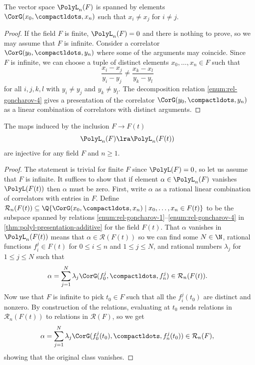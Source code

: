 \documentclass[a4paper]{amsart}
\begin{document}
\begin{proposition}\label{proposition: generic correlators}
    The vector space $\PolyL_n(F)$ is spanned by elements $\CorG(x_0,\compactldots,x_n)$ such that  $x_i\neq x_j$ for $i\neq j$.
\end{proposition}

\begin{proof} If the field $F$ is finite, $\PolyL_n(F)=0$ and there is nothing to prove, so we may assume that $F$ is infinite. Consider a correlator $\CorG(y_0,\compactldots,y_n)$ where some of the arguments may coincide. Since $F$ is infinite, we can choose a tuple of distinct elements $x_0,\dots,x_n \in F$ such that 
\[
\frac{x_i-x_j}{y_i-y_j} \neq \frac{x_k-x_l}{y_k-y_l}
\]
for all $i,j,k,l$ with $y_i\neq y_j$ and $y_k\neq y_l$. The decomposition relation \eqref{enum:rel-goncharov-4} gives a presentation of the correlator $\CorG(y_0,\compactldots,y_n)$ as a linear combination of correlators with distinct arguments.
\end{proof}

\begin{proposition} \label{prop: injectivity Goncharov complex transcendental extensions}
    The maps induced by the inclusion $F \to F(t)$
    \[\PolyL_n(F) \lra \PolyL_n(F(t))\]
    are injective for any field $F$ and $n \ge 1$. 
\end{proposition}

\begin{proof}
The statement is trivial for finite $F$ since $\PolyL(F)=0$, so let us assume that $F$ is infinite. It suffices to show that if element $\alpha \in \PolyL_n(F)$ vanishes $\PolyL(F(t))$ then $\alpha$ must be zero. First, write $\alpha$ as a rational linear combination of correlators with entries in $F$. Define $\mathcal{R}_n(F(t)) \subseteq \Q \{ \CorG(x_0,\compactldots,x_n) \mid x_0,\dots,x_n \in F(t)\}$ to be the subspace spanned by relations \eqref{enum:rel-goncharov-1}--\eqref{enum:rel-goncharov-4} in \cref{thm:polyl-presentation-additive} for the field $F(t)$. That $\alpha$ vanishes in $\PolyL_n(F(t))$ means that $\alpha \in \mathcal{R}(F(t))$ so we can find some $N \in \N$, rational functions $f_i^j \in F(t)$ for $0 \le i \le n$ and $1 \le j \le N$, and rational numbers $\lambda_j$ for $1 \le j \le N$ such that 
    \[\alpha = \sum_{j=1}^N  \lambda_j \CorG(f_0^j,\compactldots,f_n^j) \in \mathcal{R}_n(F(t)).\]
Now use that $F$ is infinite to pick $t_0 \in F$ such that all the $f_i^j(t_0)$ are distinct and nonzero. By construction of the relations, evaluating at $t_0$ sends relations in $\mathcal{R}_n(F(t))$ to relations in $\mathcal{R}(F)$, so we get
    \[\alpha = \sum_{j=1}^N  \lambda_j \CorG(f_0^j(t_0),\compactldots,f_n^j(t_0)) \in \mathcal{R}_n(F),\]
showing that the original class vanishes. 
\end{proof}
\end{document}
